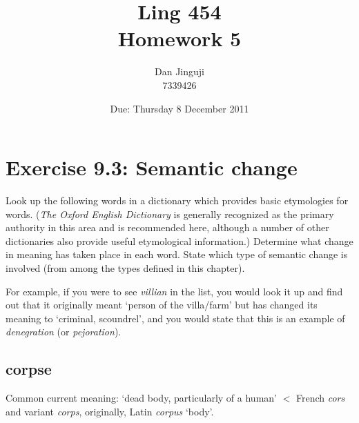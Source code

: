 \documentclass[12pt]{article}
\begin{document}
\title{Ling 454 \\ Homework 5}
\author{Dan Jinguji \\ 7339426}
\date{Due: Thursday 8 December 2011}

\maketitle

\renewcommand\thesection {\arabic{section}:}
\renewcommand\thesubsection {\arabic{subsection}.}
\renewcommand\thesubsubsection{\alph{subsubsection}.}
\newcommand{\and}{\,\&\;}
\newcommand{\llb}{\ensuremath{\llbracket}}
\newcommand{\rrb}{\ensuremath{\rrbracket}}
\newcommand{\blt}{\ensuremath{\bullet\;}}
\newcommand{\sem}[1]{\ensuremath{\llbracket\mathrm{#1}\rrbracket}}
\newcommand{\und}{\ensuremath{\_\,}}
\newcommand{\then}{\ensuremath{\rightarrow}}
\newcommand{\dom}[1]{\ensuremath{\mathbf{D}_{\mathrm{#1}}}}
\newcommand{\lamb}[3]{{[\ensuremath{\lambda\mathrm{#1}\;\in\;{#2}\;.\;}{#3}]}}
\newcommand{\ip}[1]{\textipa{#1}}

\section{Exercise 9.3: Semantic change}

Look up the following words in a dictionary which provides basic etymologies for words. ({\it The Oxford English Dictionary} is generally recognized as the primary authority in this area and is recommended here, although a number of other dictionaries also provide useful etymological information.) Determine what change in meaning has taken place in each word. State which type of semantic change is involved (from among the types defined in this chapter).

For example, if you were to see {\it villian} in the list, you would look it up and find out that it originally meant `person of the villa/farm' but has changed its meaning to `criminal, scoundrel', and you would state that this is an example of {\it denegration} (or {\it pejoration}).

\subsection{corpse}

Common current meaning: `dead body, particularly of a human' $<$ French {\it cors} and variant {\it corps}, originally, Latin {\it corpus} `body'.
\end{document}
